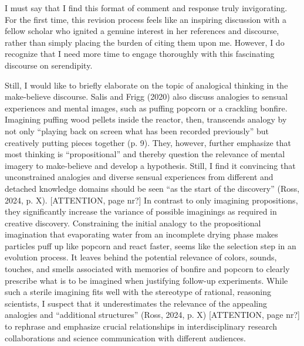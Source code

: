 \documentclass[authordate, commentary]{jote-new-article}
\begin{document}
	I must say that I find this format of comment and response truly invigorating. For the first time, this revision process feels like an inspiring discussion with a fellow scholar who ignited a genuine interest in her references and discourse, rather than simply placing the burden of citing them upon me. However, I do recognize that I need more time to engage thoroughly with this fascinating discourse on serendipity.



	Still, I would like to briefly elaborate on the topic of analogical thinking in the make-believe discourse. Salis and Frigg (2020) also discuss analogies to sensual experiences and mental images, such as puffing popcorn or a crackling bonfire. Imagining puffing wood pellets inside the reactor, then, transcends analogy by not only “playing back on screen what has been recorded previously” but creatively putting pieces together (p. 9). They, however, further emphasize that most thinking is “propositional” and thereby question the relevance of mental imagery to make-believe and develop a hypothesis. Still, I find it convincing that unconstrained analogies and diverse sensual experiences from different and detached knowledge domains should be seen “as the start of the discovery” (Ross, 2024, p. X). [ATTENTION, page nr?] In contrast to only imagining propositions, they significantly increase the variance of possible imaginings as required in creative discovery. Constraining the initial analogy to the propositional imagination that evaporating water from an incomplete drying phase makes particles puff up like popcorn and react faster, seems like the selection step in an evolution process. It leaves behind the potential relevance of colors, sounds, touches, and smells associated with memories of bonfire and popcorn to clearly prescribe what is to be imagined when justifying follow-up experiments. While such a sterile imagining fits well with the stereotype of rational, reasoning scientists, I suspect that it underestimates the relevance of the appealing analogies and “additional structures” (Ross, 2024, p. X) [ATTENTION, page nr?] to rephrase and emphasize crucial relationships in interdisciplinary research collaborations and science communication with different audiences.
\end{document}
